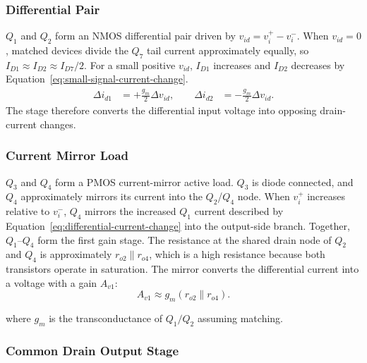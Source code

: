 \documentclass[11pt,a4paper]{article}
\begin{document}
\subsubsection{Differential Pair}

$Q_1$ and $Q_2$ form an NMOS differential pair driven by $v_{id}=v_i^+-v_i^-$. 
When $v_{id}=0$, matched devices divide the $Q_7$ tail current approximately equally, so $I_{D1}\approx I_{D2}\approx I_{D7}/2$. 
For a small positive $v_{id}$, $I_{D1}$ increases and $I_{D2}$ decreases by Equation~\ref{eq:small-signal-current-change}. 
\begin{equation}
\begin{aligned}
\Delta i_{d1} &= +\frac{g_m}{2}\Delta v_{id},
\qquad
\Delta i_{d2} &= -\frac{g_m}{2}\Delta v_{id}.
\label{eq:differential-current-change}
\end{aligned}
\end{equation}
The stage therefore converts the differential input voltage into opposing drain-current changes.

\subsubsection{Current Mirror Load}

$Q_3$ and $Q_4$ form a PMOS current-mirror active load. $Q_3$ is diode connected, and $Q_4$ approximately mirrors its current into the $Q_2$/$Q_4$ node. When $v_i^+$ increases relative to $v_i^-$, $Q_4$ mirrors the increased $Q_1$ current described by Equation~\ref{eq:differential-current-change} into the output-side branch. 
Together, $Q_1$--$Q_4$ form the first gain stage. The resistance at the shared drain node of $Q_2$ and $Q_4$ is approximately $r_{o2}\parallel r_{o4}$, which is a high resistance because both transistors operate in saturation. The mirror converts the differential current into a voltage with a gain $A_{v1}$:
\begin{equation}
    A_{v1}\approx g_m\left(r_{o2}\parallel r_{o4}\right).
    \label{eq:first-stage-gain}
\end{equation}

where $g_m$ is the transconductance of $Q_1/Q_2$ assuming matching.

\subsubsection{Common Drain Output Stage}
\end{document}
